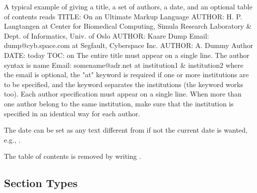 \documentclass[%
oneside,                 %
final,                   %
10pt]{article}
\begin{document}
A typical example of giving a title, a set of authors, a date,
and an optional table of contents
reads
\bccq
TITLE: On an Ultimate Markup Language
AUTHOR: H. P. Langtangen at Center for Biomedical Computing, Simula Research Laboratory & Dept. of Informatics, Univ. of Oslo
AUTHOR: Kaare Dump Email: dump@cyb.space.com at Segfault, Cyberspace Inc.
AUTHOR: A. Dummy Author
DATE: today
TOC: on
\eccq
The entire title must appear on a single line.
The author syntax is
\bccq
name Email: somename@adr.net at institution1 & institution2
\eccq
where the email is optional, the "at" keyword is required if one or
more institutions are to be specified, and the \code{&} keyword
separates the institutions (the keyword  works too).
Each author specification must appear
on a single line.
When more than one author belong to the
same institution, make sure that the institution is specified in an identical
way for each author.

The date can be set as any text different from  if not the
current date is wanted, e.g., .

The table of contents is removed by writing .


\subsection{Section Types}
\label{quick:sections}
\end{document}
